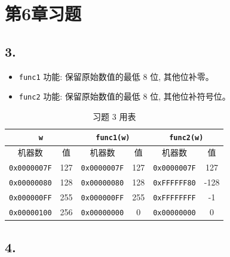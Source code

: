 \documentclass[12pt, a4paper]{ctexart}
\begin{document}
\section*{第6章习题}

\subsection*{3.}

\begin{itemize}
    \item \texttt{func1} 功能: 保留原始数值的最低 8 位, 其他位补零。
    \item \texttt{func2} 功能: 保留原始数值的最低 8 位, 其他位补符号位。
\end{itemize}

\begin{table}[H]
    \centering
    \begin{tabular}{|c|c|c|c|c|c|}
        \hline
        \multicolumn{2}{|c|}{\texttt{w}} & \multicolumn{2}{c|}{\texttt{func1(w)}} & \multicolumn{2}{c|}{\texttt{func2(w)}} \\
        \hline
        机器数 & 值 & 机器数 & 值 & 机器数 & 值 \\
        \hline
        \texttt{0x0000007F} & 127 & \texttt{0x0000007F} & 127 & \texttt{0x0000007F} &  127 \\
        \texttt{0x00000080} & 128 & \texttt{0x00000080} & 128 & \texttt{0xFFFFFF80} & -128 \\
        \texttt{0x000000FF} & 255 & \texttt{0x000000FF} & 255 & \texttt{0xFFFFFFFF} &   -1 \\
        \texttt{0x00000100} & 256 & \texttt{0x00000000} &   0 & \texttt{0x00000000} &    0 \\
        \hline
    \end{tabular}
    \caption{习题 3 用表}
\end{table}

\subsection*{4.}
\end{document}
